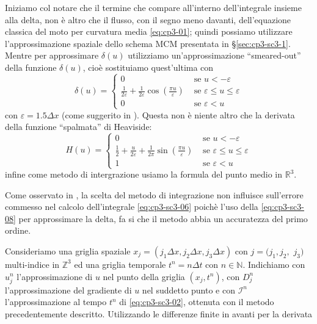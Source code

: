 Iniziamo col notare che il termine che compare all'interno
dell'integrale insieme alla delta, non è altro che il flusso, con il
segno meno davanti, dell'equazione classica del moto per curvatura
media \eqref{eq:cp3-01}; quindi possiamo utilizzare l'approssimazione
spaziale dello schema MCM presentata in §\ref{sec:cp3-sc3-1}. Mentre
per approssimare $\delta(u)$ utilizziamo un'approssimazione
``smeared-out'' della funzione $\delta(u)$, cioè sostituiamo
quest'ultima con
\begin{equation}
  \label{eq:cp3-sc3-08}
  \delta(u)=
  \begin{cases}
    0 &\text{ se $u<-\varepsilon$} \\
    \frac{1}{2\varepsilon}+\frac{1}{2\varepsilon}\cos\left(\frac{\pi
      u}{\varepsilon}\right) &\text{ se $\varepsilon\leq u \leq\varepsilon$} \\
    0 &\text{ se $\varepsilon<u$}
  \end{cases}
\end{equation}
con $\varepsilon=1.5\Delta x$ (come suggerito in
\cite[][§1.5]{osher:fed}). Questa non è niente altro che la derivata
della funzione ``spalmata'' di Heaviside:
\[
H(u)=
\begin{cases}
 0 &\text{ se $u<-\varepsilon$} \\
    \frac{1}{2}+\frac{u}{2\varepsilon} +\frac{1}{2\pi}\sin\left(\frac{\pi
      u}{\varepsilon}\right) &\text{ se $\varepsilon\leq u \leq\varepsilon$} \\
 1 &\text{ se $\varepsilon<u$} 
\end{cases}
\]
infine come metodo di intergrazione usiamo la formula del punto medio
in $\mathbb{R}^3$.
\begin{osservazione}
Come osservato in \cite[][§1.5]{osher:fed}, la scelta del metodo di
integrazione non influisce sull'errore commesso nel calcolo
dell'integrale \eqref{eq:cp3-sc3-06} poichè l'uso della
\eqref{eq:cp3-sc3-08} per approssimare la delta, fa si che il  metodo
abbia un accuratezza del primo ordine.
\end{osservazione}
Consideriamo una griglia spaziale $x_j=(j_1\Delta x,j_2\Delta
x,j_3\Delta x)$ con $j=(j_1,j_2,$ $j_3)$ multi-indice in $\mathbb{Z}^3$ ed una griglia temporale $t^n=n\Delta t$ con $n\in\mathbb{N}$.
Indichiamo con $u_j^n$ l'approssimazione di $u$ nel punto della
griglia $(x_j,t^n)$, con $D_j^n$ l'approssimazione del gradiente di
$u$ nel suddetto punto e con $\mathcal{I}^n$ l'approssimazione al tempo $t^n$ di
\eqref{eq:cp3-sc3-02}, ottenuta con il metodo precedentemente
descritto. Utilizzando le differenze finite in avanti per la derivata
